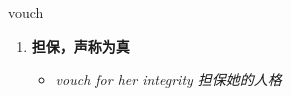 
\begin{frame}
{\huge vouch}
\begin{center}
\begin{enumerate}\Large
  \item \textbf{担保，声称为真}
  \begin{itemize}
    \item \em{\Large{vouch for her integrity 担保她的人格}}
  \end{itemize}
\end{enumerate}
\end{center}
\end{frame}
